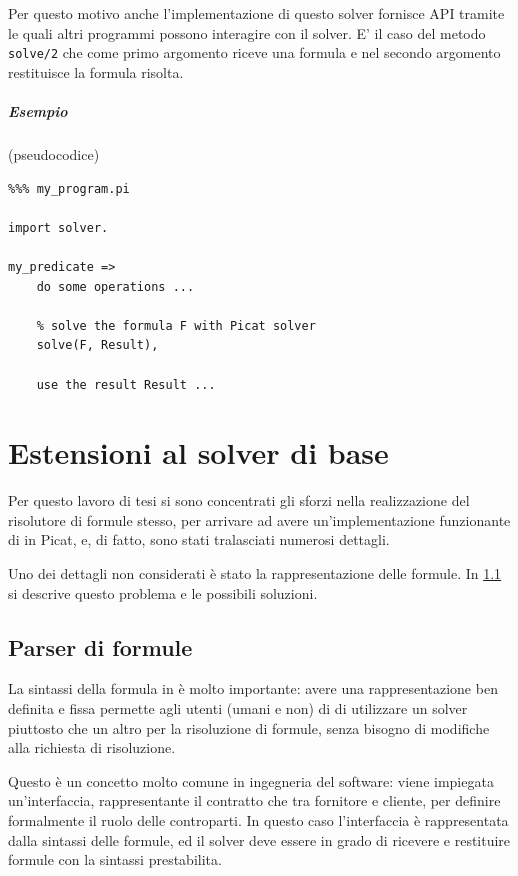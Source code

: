 \documentclass[12pt,a4paper,openright]{book} %
\begin{document}
Per questo motivo anche l'implementazione di questo solver fornisce
API tramite le quali altri programmi possono interagire con il
solver. E' il caso del metodo \verb|solve/2| che come primo argomento
riceve una formula e nel secondo argomento restituisce la formula
risolta.

\paragraph{Esempio} (pseudocodice)
\begin{verbatim}
%%% my_program.pi

import solver.

my_predicate =>
    do some operations ...

    % solve the formula F with Picat solver
    solve(F, Result),

    use the result Result ...
\end{verbatim}



\chapter{Estensioni al solver di base}
\label{ch:ext}

\minitoc

Per questo lavoro di tesi si sono concentrati gli sforzi nella
realizzazione del risolutore di formule stesso, per arrivare ad avere
un'implementazione funzionante di \lset{} in Picat, e, di fatto, sono
stati tralasciati numerosi dettagli.

Uno dei dettagli non considerati è stato la rappresentazione delle
formule. In \ref{sec:ext_formulas} si descrive questo problema e le
possibili soluzioni.

\section{Parser di formule}
\label{sec:ext_formulas}

La sintassi della formula in \lset{} è molto importante: avere una
rappresentazione ben definita e fissa permette agli utenti (umani e
non) di \lset{} di utilizzare un solver piuttosto che un altro per la
risoluzione di formule, senza bisogno di modifiche alla richiesta di
risoluzione.

Questo è un concetto molto comune in ingegneria del software: viene
impiegata un'interfaccia, rappresentante il contratto che tra
fornitore e cliente, per definire formalmente il ruolo delle
controparti. In questo caso l'interfaccia è rappresentata dalla
sintassi delle formule, ed il solver deve essere in grado di ricevere
e restituire formule con la sintassi prestabilita.
\end{document}
